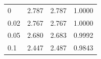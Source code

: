\begin{tabular}{llll}
0 & 2.787 & 2.787 & 1.0000 \\
0.02 & 2.767 & 2.767 & 1.0000 \\
0.05 & 2.680 & 2.683 & 0.9992 \\
0.1 & 2.447 & 2.487 & 0.9843 \\
\end{tabular}
